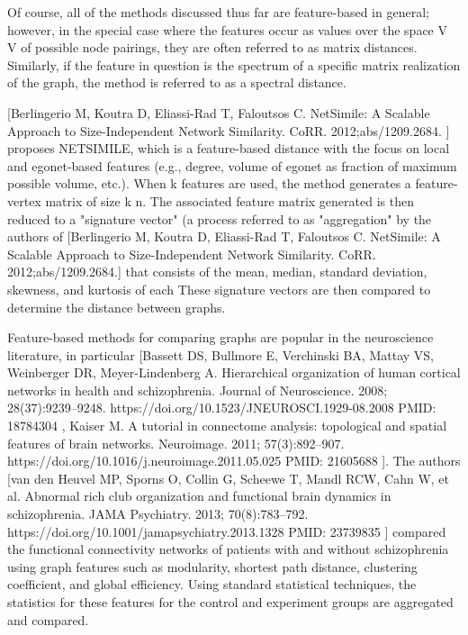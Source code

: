 Of course, all of the methods discussed thus far are feature-based in general; however, in the special case where the features occur as values over the space V V of possible node pairings, they are often referred to as  matrix distances. Similarly, if the feature in question is the spectrum of a specific matrix realization of the graph, the method is referred to as a spectral distance.

[Berlingerio M, Koutra D, Eliassi-Rad T, Faloutsos C. NetSimile: A Scalable Approach to Size-Independent Network Similarity. CoRR. 2012;abs/1209.2684. ] proposes NETSIMILE, which is a feature-based distance with the  focus on local and egonet-based features (e.g., degree, volume of egonet as fraction of maximum possible volume, etc.). When k features are used, the method generates a feature-vertex matrix of size k n. The associated feature matrix generated is then reduced to a "signature vector" (a process referred to as "aggregation" by the authors of [Berlingerio M, Koutra D, Eliassi-Rad T, Faloutsos C. NetSimile: A Scalable Approach to Size-Independent Network Similarity. CoRR. 2012;abs/1209.2684.] that consists of the mean, median, standard deviation, skewness, and kurtosis of each These signature vectors are then compared to determine the distance between graphs.

Feature-based methods for comparing graphs are popular in the neuroscience literature, in particular [Bassett DS, Bullmore E, Verchinski BA, Mattay VS, Weinberger DR, Meyer-Lindenberg A. Hierarchical organization of human cortical networks in health and schizophrenia. Journal of Neuroscience. 2008; 28(37):9239–9248. https://doi.org/10.1523/JNEUROSCI.1929-08.2008 PMID: 18784304 , Kaiser M. A tutorial in connectome analysis: topological and spatial features of brain networks. Neuroimage. 2011; 57(3):892–907. https://doi.org/10.1016/j.neuroimage.2011.05.025 PMID: 21605688 ]. The authors [van den Heuvel MP, Sporns O, Collin G, Scheewe T, Mandl RCW, Cahn W, et al. Abnormal rich club organization and functional brain dynamics in schizophrenia. JAMA Psychiatry. 2013; 70(8):783–792. https://doi.org/10.1001/jamapsychiatry.2013.1328 PMID: 23739835 ] compared the  functional connectivity networks of patients with and without schizophrenia using graph features such as modularity, shortest path distance, clustering coefficient, and global efficiency. Using standard statistical techniques, the statistics for these features for the control and experiment groups are aggregated and compared.

